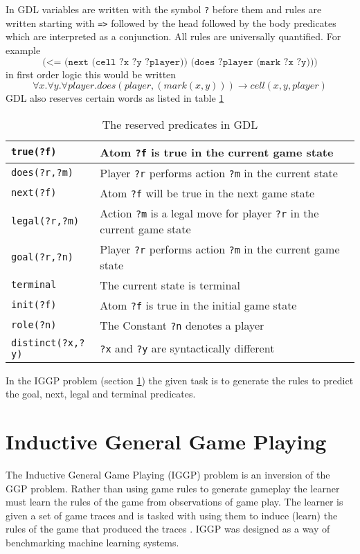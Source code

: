 In GDL variables are written with the symbol \texttt{?} before them and rules are written starting with \verb|=>| followed by the head followed by the body predicates which are interpreted as a conjunction. All rules are universally quantified. For example
\[\texttt{(<= (next (cell ?x ?y ?player)) (does ?player (mark ?x ?y)))}\]
in first order logic this would be written
\[\forall x. \forall y. \forall player. does(player,(mark(x,y))) \rightarrow cell(x,y,player)\]
GDL also reserves certain words as listed in table \ref{tab:GDL}
\begin{center}
	\begin{table}
	\begin{tabular}{| l | l |}
		\hline
		\texttt{true(?f)} & Atom \texttt{?f} is true in the current game state \\ \hline
		\texttt{does(?r,?m)} & Player \texttt{?r} performs action \texttt{?m} in the current state \\ \hline
		\texttt{next(?f)} & Atom \texttt{?f} will be true in the next game state \\ \hline
		\texttt{legal(?r,?m)} & Action \texttt{?m} is a legal move for player \texttt{?r} in the current game state\\ \hline
		\texttt{goal(?r,?n)} & Player \texttt{?r} performs action \texttt{?m} in the current game state\\ \hline
		\texttt{terminal} & The current state is terminal\\ \hline
		\texttt{init(?f)} & Atom \texttt{?f} is true in the initial game state\\ \hline
		\texttt{role(?n)} & The Constant \texttt{?n} denotes a player\\ \hline
		\texttt{distinct(?x,?y)} & \texttt{?x} and \texttt{?y} are syntactically different\\
		\hline

	\end{tabular}
	\caption{The reserved predicates in GDL}
\label{tab:GDL}
\end{table}

\end{center}


In the IGGP problem (section \ref{sec:IGGP}) the given task is to generate the rules to predict the goal, next, legal and terminal predicates.


\section{Inductive General Game Playing}\label{sec:IGGP}
The Inductive General Game Playing (IGGP) problem is an inversion of the GGP problem. Rather than using game rules to generate gameplay the learner must learn the rules of the game from observations of game play. The learner is given a set of game traces and is tasked with using them to induce (learn) the rules of the game that produced the traces \cite{Cropper/IGGP}. IGGP was designed as a way of benchmarking machine learning systems.

